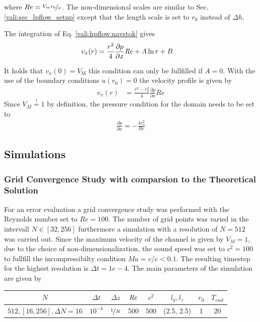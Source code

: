 where $Re = \nicefrac{V_{m}r_0}{\nu}$.
The non-dimensional scales are similar to Sec. \ref{vali:sec_lpflow_setup}  except that the length scale is set to $r_0$ instead of $\Delta h$.

The integration of Eq. \ref{vali:hpflow:navstok} gives
\begin{align}
    v_x(r) &= \frac{r^2}{4}\frac{\partial p}{\partial x}\mbox{\textit{Re}} + A \ln r + B
\end{align}

It holds that $v_x(0)= V_{\text{M}}$ this condition can only be fullfilled if $A=0$.
With the use of the boundary conditions $u(r_0) = 0$ the velocity profile is given by
\begin{align}
    v_x(r) &= \frac{r^2 - r_0^2}{4}\frac{\partial p}{\partial x}Re
\end{align}
Since $V_{M} \stackrel{!}{=} 1$ by definition, the pressure condition for the domain needs to be set to
\begin{align}
    \frac{\partial p}{\partial x} = -\frac{4 r_o^2}{Re}
\end{align}

\subsection{Simulations}

\subsubsection{Grid Convergence Study with comparsion to the Theoretical Solution}

For an error evaluation a grid convergence study was performed with the Reynolds number set to $Re=100$.
The number of grid points was varied in the intervall $N\in[32, 256]$ furthermore a
simulation with a resolution of $N=512$ was carried out.
Since the maximum velocity of the channel is given by $V_{M}=1$, due to the choice of non-dimensionalization,
the sound speed was set to $c^2 = 100$ to fullfill the incompressibilty condition $Ma = v/c < 0.1$.
The resulting timestep for the highest resolution is $\Delta t = 1e-4$.
The main parameters of the simulation are  given by

\begin{center}
\vspace*{0.7ex}
\begin{tabular}{c|c|c|c|c|c|c|c }
 $ N  $                   & $\Delta t$ & $\Delta z$            & $\mbox{\textit{Re}}$  & $c^2$   & $l_y, l_z$ & $r_0$ & $T_{end}$\\
\hline
 $512, [16, 256], \Delta N = 16 $& $10^{-4}$ & $\nicefrac{1}{N}$ & 500     & $500$   & (2.5, 2.5) & 1     & 20\\
\end{tabular}
\vspace*{0.7ex}
\end{center}

